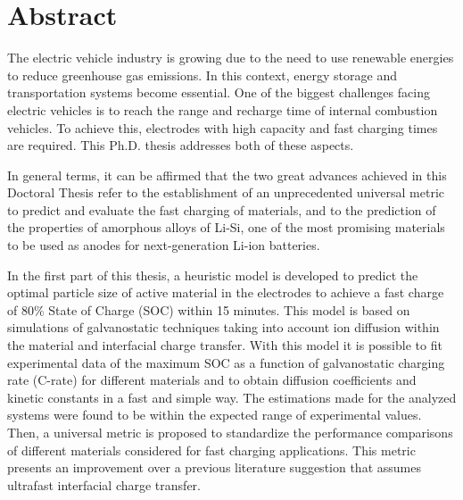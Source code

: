 \chapter{Abstract}

The electric vehicle industry is growing due to the need to use renewable 
energies to reduce greenhouse gas emissions. In this context, energy storage and 
transportation systems become essential. One of the biggest challenges facing 
electric vehicles is to reach the range and recharge time of internal combustion
vehicles. To achieve this, electrodes with high capacity and fast charging times 
are required. This Ph.D. thesis addresses both of these aspects.

In general terms, it can be affirmed that the two great advances achieved in this 
Doctoral Thesis refer to the establishment of an unprecedented universal metric 
to predict and evaluate the fast charging of materials, and to the prediction of 
the properties of amorphous alloys of Li-Si, one of the most promising materials
to be used as anodes for next-generation Li-ion batteries.

In the first part of this thesis, a heuristic model is developed to predict the 
optimal particle size of active material in the electrodes to achieve a fast 
charge of 80\% State of Charge (SOC) within 15 minutes. This model is based on 
simulations of galvanostatic techniques taking into account ion diffusion within 
the material and interfacial charge transfer. With this model it is possible to 
fit experimental data of the maximum SOC as a function of galvanostatic charging rate (C-rate) for different 
materials and to obtain diffusion coefficients and kinetic constants in a fast 
and simple way. The estimations made for the analyzed systems were found to be 
within the expected range of experimental values. Then, a universal metric is 
proposed to standardize the performance comparisons of different materials 
considered for fast charging applications. This metric presents an improvement 
over a previous literature suggestion that assumes ultrafast interfacial charge 
transfer.

